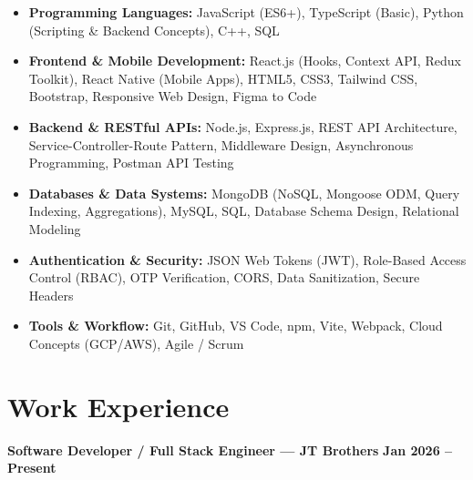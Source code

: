 \documentclass[a4paper,10pt]{article}
\begin{document}
\begin{itemize}

    \item \textbf{Programming Languages:}
    JavaScript (ES6+), TypeScript (Basic), Python (Scripting \& Backend Concepts), C++, SQL

    \item \textbf{Frontend \& Mobile Development:}
    React.js (Hooks, Context API, Redux Toolkit), React Native (Mobile Apps),
    HTML5, CSS3, Tailwind CSS, Bootstrap, Responsive Web Design, Figma to Code

    \item \textbf{Backend \& RESTful APIs:}
    Node.js, Express.js, REST API Architecture, Service-Controller-Route Pattern,
    Middleware Design, Asynchronous Programming, Postman API Testing

    \item \textbf{Databases \& Data Systems:}
    MongoDB (NoSQL, Mongoose ODM, Query Indexing, Aggregations),
    MySQL, SQL, Database Schema Design, Relational Modeling

    \item \textbf{Authentication \& Security:}
    JSON Web Tokens (JWT), Role-Based Access Control (RBAC),
    OTP Verification, CORS, Data Sanitization, Secure Headers

    \item \textbf{Tools \& Workflow:}
    Git, GitHub, VS Code, npm, Vite, Webpack, Cloud Concepts (GCP/AWS), Agile / Scrum

\end{itemize}

\section*{Work Experience}

\textbf{Software Developer / Full Stack Engineer --- JT Brothers}
\hfill
\textbf{Jan 2026 -- Present}
\end{document}
